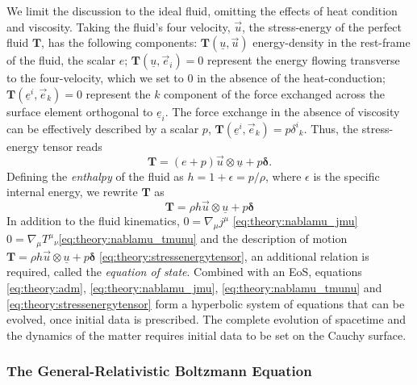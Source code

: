 We limit the discussion to the ideal fluid, omitting the effects of heat condition and viscosity.
Taking the fluid's four velocity, $\vec{u}$, the stress-energy of the perfect fluid $\boldsymbol{T}$, has the following components:
$\boldsymbol{T}(\underline{u}, \vec{u})$ energy-density in the rest-frame of the fluid, the scalar $e$;
$\boldsymbol{T}(\underline{u}, \vec{e}_i) = 0$ represent the energy flowing transverse to the four-velocity, which we set to $0$ in the absence of the heat-conduction;
$\boldsymbol{T}(\underline{e}^i, \vec{e}_k) = 0$ represent the $k$ component of the force exchanged across the surface element orthogonal to $\underline{e}_i$.
The force exchange in the absence of viscosity can be effectively described by a scalar $p$, 
$\boldsymbol{T}(\underline{e}^i,\vec{e}_k) = p {\delta^i}_k$.
Thus, the stress-energy tensor reads
\begin{equation}
\boldsymbol{T} = (e + p)\vec{u}\otimes \underline{u} + p\boldsymbol{\delta}.
\end{equation}
Defining the \textit{enthalpy} of the fluid as $h = 1 + \epsilon = p/\rho$, where $\epsilon$ is the specific internal energy, we rewrite $\boldsymbol{T}$ as 
\begin{equation}
\boldsymbol{T} = \rho h \vec{u}\otimes\underline{u} + p\boldsymbol{\delta}
\end{equation}
In addition to the fluid kinematics,
$0 = \nabla_{\mu} j^{\mu}$ \ref{eq:theory:nablamu_jmu}
$0 = \nabla_{\mu}{T^{\mu}}_{\nu}$\ref{eq:theory:nablamu_tmunu}
 and the description of motion
$\boldsymbol{T} = \rho h \vec{u}\otimes\underline{u} + p\boldsymbol{\delta}$ \ref{eq:theory:stressenergytensor},
an additional relation is required, called the \textit{equation of state}.
Combined with an EoS, equations \ref{eq:theory:adm}, \ref{eq:theory:nablamu_jmu}, \ref{eq:theory:nablamu_tmunu} and \ref{eq:theory:stressenergytensor} form a hyperbolic
system of equations that can be evolved, once initial data is prescribed. 
The complete evolution of spacetime and the dynamics of the matter requires initial data to be set on the Cauchy surface.



\subsubsection{The General-Relativistic Boltzmann Equation}


